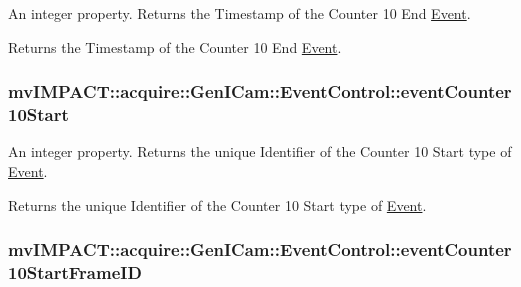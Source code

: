 An integer property. Returns the Timestamp of the Counter 10 End \hyperlink{classmv_i_m_p_a_c_t_1_1acquire_1_1_event}{Event}. 

Returns the Timestamp of the Counter 10 End \hyperlink{classmv_i_m_p_a_c_t_1_1acquire_1_1_event}{Event}. \hypertarget{classmv_i_m_p_a_c_t_1_1acquire_1_1_gen_i_cam_1_1_event_control_a4ed08e48d6498875164cb0aa473283c8}{
\subsubsection[{event\+Counter10\+Start}]{ mv\+I\+M\+P\+A\+C\+T\+::acquire\+::\+Gen\+I\+Cam\+::\+Event\+Control\+::event\+Counter10\+Start}}\label{classmv_i_m_p_a_c_t_1_1acquire_1_1_gen_i_cam_1_1_event_control_a4ed08e48d6498875164cb0aa473283c8}


An integer property. Returns the unique Identifier of the Counter 10 Start type of \hyperlink{classmv_i_m_p_a_c_t_1_1acquire_1_1_event}{Event}. 

Returns the unique Identifier of the Counter 10 Start type of \hyperlink{classmv_i_m_p_a_c_t_1_1acquire_1_1_event}{Event}. \hypertarget{classmv_i_m_p_a_c_t_1_1acquire_1_1_gen_i_cam_1_1_event_control_a0ff053420dd6f64aa50f904d4870731e}{
\subsubsection[{event\+Counter10\+Start\+Frame\+I\+D}]{ mv\+I\+M\+P\+A\+C\+T\+::acquire\+::\+Gen\+I\+Cam\+::\+Event\+Control\+::event\+Counter10\+Start\+Frame\+I\+D}}\label{classmv_i_m_p_a_c_t_1_1acquire_1_1_gen_i_cam_1_1_event_control_a0ff053420dd6f64aa50f904d4870731e}


